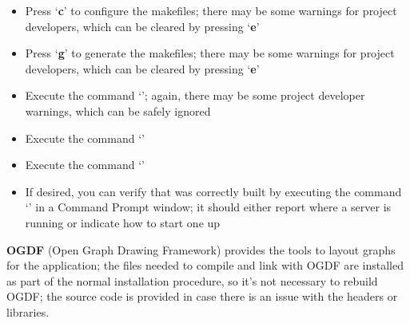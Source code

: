 \begin{itemize}
and\\
`\textbf{YARP\fUS{}USE\fUS{}READLINE}' (if present) should be disabled
\item\exSp{}Press `\textbf{c}' to configure the makefiles; there may be some
 warnings for project developers, which can be cleared by pressing
`\textbf{e}'
\item\exSp{}Press `\textbf{g}' to generate the makefiles; there may be some 
warnings for project developers, which can be cleared by pressing `\textbf{e}'
\item\exSp{}Execute the command `'; again, there may be some project
developer warnings, which can be safely ignored
\item\exSp{}Execute the command `'
\item\exSp{}Execute the command `'
\item\exSp{}If desired, you can verify that \yarp{} was correctly built by executing the
command `' in a Command Prompt window; it should either report where a
\yarp{} server is running or indicate how to start one up
\end{itemize}
\tertiaryEnd
\secondaryEnd
{}
\textbf{OGDF} (Open Graph Drawing Framework) provides the tools to layout graphs for the
\MMMU{} application; the files needed to compile and link with OGDF are installed as part
of the normal \mplusm{} installation procedure, so it's not necessary to rebuild OGDF; the
source code is provided in case there is an issue with the headers or libraries.
